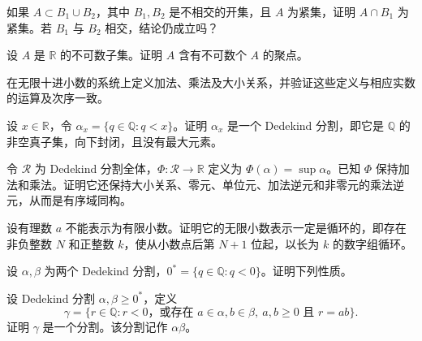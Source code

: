 \noindent\begin{minipage}{\textwidth}
如果 $A\subset B_1\cup B_2$，其中 $B_1,B_2$ 是不相交的开集，且 $A$ 为紧集，证明 $A\cap B_1$ 为紧集。若 $B_1$ 与 $B_2$ 相交，结论仍成立吗？
\end{minipage}\par\vfill
\noindent\begin{minipage}{\textwidth}
设 $A$ 是 $\mathbb R$ 的不可数子集。证明 $A$ 含有不可数个 $A$ 的聚点。
\end{minipage}\par\vfill
\newpage
\noindent\begin{minipage}{\textwidth}
在无限十进小数的系统上定义加法、乘法及大小关系，并验证这些定义与相应实数的运算及次序一致。
\end{minipage}\par\vfill
\noindent\begin{minipage}{\textwidth}
设 $x\in\mathbb R$，令 $\alpha_x=\{q\in\mathbb Q:q<x\}$。证明 $\alpha_x$ 是一个 Dedekind 分割，即它是 $\mathbb Q$ 的非空真子集，向下封闭，且没有最大元素。
\end{minipage}\par\vfill
\noindent\begin{minipage}{\textwidth}
令 $\mathcal R$ 为 Dedekind 分割全体，$\Phi:\mathcal R\to\mathbb R$ 定义为 $\Phi(\alpha)=\sup\alpha$。已知 $\Phi$ 保持加法和乘法。证明它还保持大小关系、零元、单位元、加法逆元和非零元的乘法逆元，从而是有序域同构。
\end{minipage}\par\vfill
\noindent\begin{minipage}{\textwidth}
设有理数 $a$ 不能表示为有限小数。证明它的无限小数表示一定是循环的，即存在非负整数 $N$ 和正整数 $k$，使从小数点后第 $N+1$ 位起，以长为 $k$ 的数字组循环。
\end{minipage}\par\vfill
\newpage
\noindent\begin{minipage}{\textwidth}
设 $\alpha,\beta$ 为两个 Dedekind 分割，$0^*=\{q\in\mathbb Q:q<0\}$。证明下列性质。
\end{minipage}\par\vfill
\noindent\begin{minipage}{\textwidth}
设 Dedekind 分割 $\alpha,\beta\ge0^*$，定义\[\gamma=\{r\in\mathbb Q:r<0\text{，或存在 }a\in\alpha,b\in\beta,\ a,b\ge0\text{ 且 }r=ab\}.\]证明 $\gamma$ 是一个分割。该分割记作 $\alpha\beta$。
\end{minipage}\par\vfill
